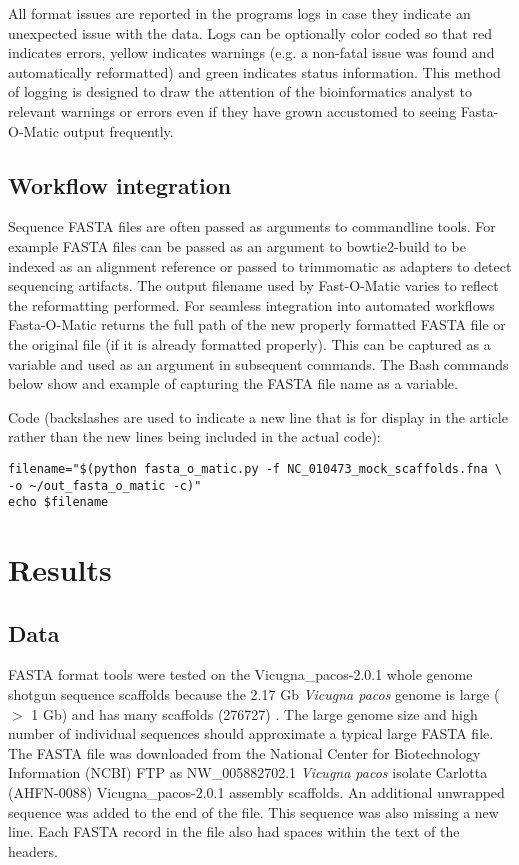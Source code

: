 \documentclass{bmcart}
\begin{document}
All format issues are reported in the programs logs in case they indicate an unexpected issue with the data. Logs can be optionally color coded so that red indicates errors, yellow indicates warnings (e.g. a non-fatal issue was found and automatically reformatted) and green indicates status information. This method of logging is designed to draw the attention of the bioinformatics analyst to relevant warnings or errors even if they have grown accustomed to seeing Fasta-O-Matic output frequently.
  
\subsection{Workflow integration}
 
Sequence FASTA files are often passed as arguments to commandline tools. For example FASTA files can be passed as an argument to bowtie2-build to be indexed as an alignment reference \cite{langmead2012fast} or passed to trimmomatic as adapters to detect sequencing artifacts. The output filename used by Fast-O-Matic varies to reflect the reformatting performed. For seamless integration into automated workflows Fasta-O-Matic returns the full path of the new properly formatted FASTA file or the original file (if it is already formatted properly). This can be captured as a variable and used as an argument in subsequent commands. The Bash commands below show and example of capturing the FASTA file name as a variable.

Code (backslashes are used to indicate a new line that is for display in the article rather than the new lines being included in the actual code):

\begin{verbatim}
filename="$(python fasta_o_matic.py -f NC_010473_mock_scaffolds.fna \
-o ~/out_fasta_o_matic -c)"
echo $filename
\end{verbatim}

\section{Results}

\subsection{Data}

FASTA format tools were tested on the Vicugna\_pacos-2.0.1 whole genome shotgun sequence scaffolds because the 2.17 Gb \textit{Vicugna pacos} genome is large ($>$ 1 Gb) and has many scaffolds (276727) \cite{Lindblad_Toh_2011}. The large genome size and high number of individual sequences should approximate a typical large FASTA file. The FASTA file was downloaded from the National Center for Biotechnology Information (NCBI) FTP as NW\_005882702.1 \textit{Vicugna pacos} isolate Carlotta (AHFN-0088) Vicugna\_pacos-2.0.1 assembly scaffolds.
An additional unwrapped sequence was added to the end of the file. This sequence was also missing a new line. Each FASTA record in the file also had spaces within the text of the headers.
\end{document}
